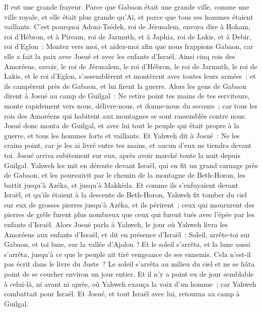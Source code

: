 \begin{multicols}{2}
Il eut une grande frayeur. Parce que Gabaon était une grande ville, comme une ville royale, et elle était plus grande qu'Aï, et parce que tous ses hommes étaient vaillants.
C'est pourquoi Adoni-Tsédek, roi de Jérusalem, envoya dire à Hoham, roi d'Hébron, et à Piream, roi de Jarmuth, et à Japhia, roi de Lakis, et à Debir, roi d'Eglon~:
Montez vers moi, et aidez-moi afin que nous frappions Gabaon, car elle a fait la paix avec Josué et avec les enfants d'Israël.
Ainsi cinq rois des Amoréens, savoir, le roi de Jérusalem, le roi d'Hébron, le roi de Jarmuth, le roi de Lakis, et le roi d'Eglon, s'assemblèrent et montèrent avec toutes leurs armées~; et ils campèrent près de Gabaon, et lui firent la guerre.
Alors les gens de Gabaon dirent à Josué au camp de Guilgal~: Ne retire point tes mains de tes serviteurs, monte rapidement vers nous, délivre-nous, et donne-nous du secours~; car tous les rois des Amoréens qui habitent aux montagnes se sont rassemblés contre nous.
Josué donc monta de Guilgal, et avec lui tout le peuple qui était propre à la guerre, et tous les hommes forts et vaillants.
Et Yahweh dit à Josué~: Ne les crains point, car je les ai livré entre tes mains, et aucun d'eux ne tiendra devant toi.
Josué arriva subitement sur eux, après avoir marché toute la nuit depuis Guilgal.
Yahweh les mit en déroute devant Israël, qui en fit un grand carnage près de Gabaon, et les poursuivit par le chemin de la montagne de Beth-Horon, les battit jusqu'à Azéka, et jusqu'à Makkéda.
Et comme ils s'enfuyaient devant Israël, et qu'ils étaient à la descente de Beth-Horon, Yahweh fit tomber du ciel sur eux de grosses pierres jusqu'à Azéka, et ils périrent~; ceux qui moururent des pierres de grêle furent plus nombreux que ceux qui furent tués avec l'épée par les enfants d'Israël.
Alors Josué parla à Yahweh, le jour où Yahweh livra les Amoréens aux enfants d'Israël, et dit en présence d'Israël~: Soleil, arrête-toi sur Gabaon, et toi lune, sur la vallée d'Ajalon~!
Et le soleil s'arrêta, et la lune aussi s'arrêta, jusqu'à ce que le peuple ait tiré vengeance de ses ennemis. Cela n'est-il pas écrit dans le livre du Juste~? Le soleil s'arrêta au milieu du ciel et ne se hâta point de se coucher environ un jour entier.
Et il n'y a point eu de jour semblable à celui-là, ni avant ni après, où Yahweh exauça la voix d'un homme~; car Yahweh combattait pour Israël.
Et Josué, et tout Israël avec lui, retourna au camp à Guilgal.

\end{multicols}
